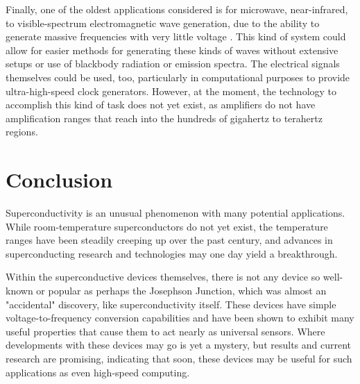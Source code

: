\documentclass[letterpaper,english,reprint, aps]{revtex4}
\begin{document}
Finally, one of the oldest applications considered is for microwave, near-infrared, to visible-spectrum electromagnetic wave generation, due to the ability to generate massive frequencies with very little voltage \citep{jj_wave}. This kind of system could allow for easier methods for generating these kinds of waves without extensive setups or use of blackbody radiation or emission spectra. The electrical signals themselves could be used, too, particularly in computational purposes to provide ultra-high-speed clock generators. However, at the moment, the technology to accomplish this kind of task does not yet exist, as amplifiers do not have amplification ranges that reach into the hundreds of gigahertz to terahertz regions.

\section{Conclusion}
Superconductivity is an unusual phenomenon with many potential applications. While room-temperature superconductors do not yet exist, the temperature ranges have been steadily creeping up over the past century, and advances in superconducting research and technologies may one day yield a breakthrough.

Within the superconductive devices themselves, there is not any device so well-known or popular as perhaps the Josephson Junction, which was almost an "accidental" discovery, like superconductivity itself. These devices have simple voltage-to-frequency conversion capabilities and have been shown to exhibit many useful properties that cause them to act nearly as universal sensors. Where developments with these devices may go is yet a mystery, but results and current research are promising, indicating that soon, these devices may be useful for such applications as even high-speed computing.
\end{document}
